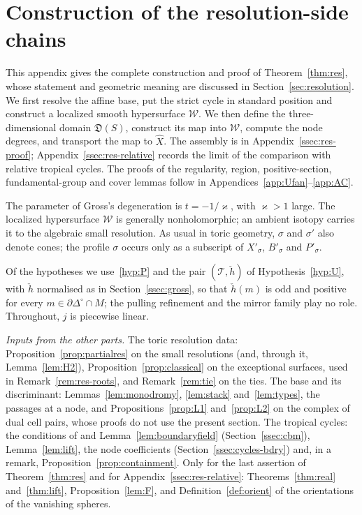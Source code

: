\section{Construction of the resolution-side chains}\label{app:original}

This appendix gives the complete construction and proof of Theorem~\ref{thm:res}, whose statement and geometric
meaning are discussed in Section~\ref{sec:resolution}. We first resolve the affine base, put the strict cycle in
standard position and construct a localized smooth hypersurface $\mathscr W$. We then define the three-dimensional
domain $\mathfrak D(S)$, construct its map into $\mathscr W$, compute the node degrees, and transport the map to
$\widehat X$. The assembly is in Appendix~\ref{ssec:res-proof}; Appendix~\ref{ssec:res-relative} records the limit of
the comparison with relative tropical cycles. The proofs of the regularity, region, positive-section, fundamental-group
and cover lemmas follow in Appendices~\ref{app:Ufan}--\ref{app:AC}.

The parameter of Gross's degeneration is $t=-1/\varkappa$, with $\varkappa>1$ large. The localized hypersurface
$\mathscr W$ is generally nonholomorphic; an ambient isotopy carries it to the algebraic small resolution.
As usual in toric geometry, $\sigma$ and $\sigma'$ also denote cones; the profile $\sigma$ occurs only as a subscript
of $X'_\sigma$, $B'_\sigma$ and $P'_\sigma$.

Of the hypotheses we use~\ref{hyp:P} and the pair $(\mathcal T,\check h)$ of Hypothesis~\ref{hyp:U}, with $\check h$
normalised as in Section~\ref{ssec:gross}, so that $\check h(m)$ is odd and positive for every
$m\in\partial\Delta^\circ\cap M$; the pulling refinement and the mirror family play no role. Throughout, $j$ is piecewise
linear.

\emph{Inputs from the other parts.} The toric resolution data: Proposition~\ref{prop:partialres} on the small resolutions
(and, through it, Lemma~\ref{lem:H2}), Proposition~\ref{prop:classical} on the exceptional surfaces, used in
Remark~\ref{rem:res-roots}, and Remark~\ref{rem:tie} on the ties. The base and its discriminant:
Lemmas~\ref{lem:monodromy}, \ref{lem:stack} and~\ref{lem:types}, the passages at a node, and
Propositions~\ref{prop:L1} and~\ref{prop:L2} on the complex of dual cell pairs, whose proofs do not use the present section. The
tropical cycles: the conditions of \cite[Def.~7.2]{CBM} and Lemma~\ref{lem:boundaryfield} (Section~\ref{ssec:cbm}),
Lemma~\ref{lem:lift}, the node coefficients (Section~\ref{ssec:cycles-bdry}) and, in a remark,
Proposition~\ref{prop:containment}. Only for the last assertion of Theorem~\ref{thm:res} and for
Appendix~\ref{ssec:res-relative}: Theorems~\ref{thm:real} and~\ref{thm:lift}, Proposition~\ref{lem:F}, and
Definition~\ref{def:orient} of the orientations of the vanishing spheres.

